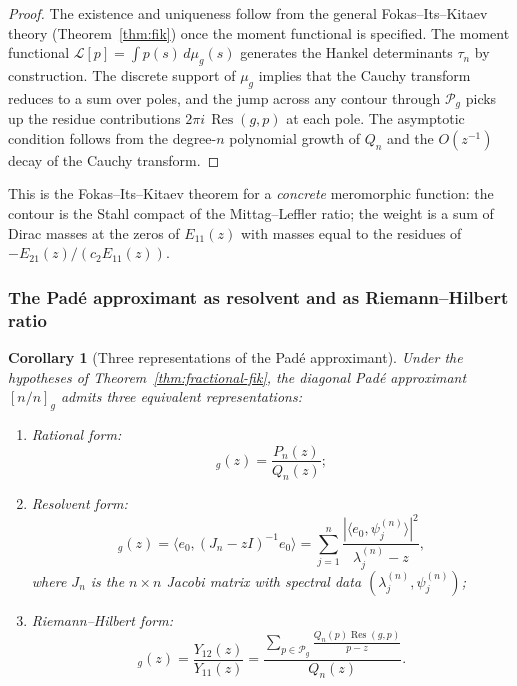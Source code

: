 \documentclass[11pt]{article}
\newtheorem{corollary}[theorem]{Corollary}
\theoremstyle{definition}
\theoremstyle{remark}
\DeclareMathOperator{\Res}{Res}
\begin{document}
\begin{proof}
The existence and uniqueness follow from the general Fokas--Its--Kitaev theory (Theorem~\ref{thm:fik}) once the moment functional is specified. The moment functional $\mathcal{L}[p]=\int p(s)\,d\mu_{g}(s)$ generates the Hankel determinants $\tau_{n}$ by construction. The discrete support of $\mu_{g}$ implies that the Cauchy transform reduces to a sum over poles, and the jump across any contour through $\mathcal{P}_{g}$ picks up the residue contributions $2\pi i\,\Res(g,p)$ at each pole. The asymptotic condition follows from the degree-$n$ polynomial growth of $Q_{n}$ and the $O(z^{-1})$ decay of the Cauchy transform.
\end{proof}

This is the Fokas--Its--Kitaev theorem for a \emph{concrete} meromorphic function: the contour is the Stahl compact of the Mittag--Leffler ratio; the weight is a sum of Dirac masses at the zeros of $E_{11}(z)$ with masses equal to the residues of $-E_{21}(z)/(c_{2}E_{11}(z))$.

\subsubsection{The Pad\'e approximant as resolvent and as Riemann--Hilbert ratio}
\label{sec:three-representations}

\begin{corollary}[Three representations of the Pad\'e approximant]
\label{cor:three-representations}
Under the hypotheses of Theorem~\ref{thm:fractional-fik}, the diagonal Pad\'e approximant $[n/n]_{g}$ admits three equivalent representations:
\begin{enumerate}[label=(\alph*)]
\item \emph{Rational form:}
\begin{equation}
[n/n]_{g}(z)=\frac{P_{n}(z)}{Q_{n}(z)};
\label{eq:rep-rational}
\end{equation}
\item \emph{Resolvent form:}
\begin{equation}
[n/n]_{g}(z)=\langle e_{0},(J_{n}-zI)^{-1}e_{0}\rangle
=\sum_{j=1}^{n}\frac{|\langle e_{0},\psi_{j}^{(n)}\rangle|^{2}}{\lambda_{j}^{(n)}-z},
\label{eq:rep-resolvent}
\end{equation}
where $J_{n}$ is the $n\times n$ Jacobi matrix with spectral data $(\lambda_{j}^{(n)},\psi_{j}^{(n)})$;
\item \emph{Riemann--Hilbert form:}
\begin{equation}
[n/n]_{g}(z)=\frac{Y_{12}(z)}{Y_{11}(z)}
=\frac{\displaystyle\sum_{p\in\mathcal{P}_{g}}\frac{Q_{n}(p)\Res(g,p)}{p-z}}{Q_{n}(z)}.
\label{eq:rep-rh}
\end{equation}
\end{enumerate}
\end{corollary}
\end{document}

